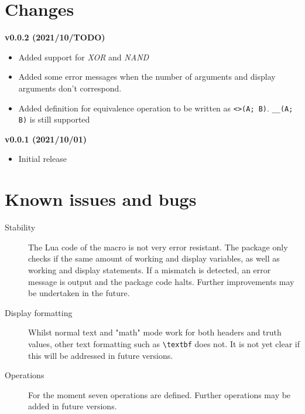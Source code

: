 \documentclass[a4paper]{article}
\begin{document}
\section{Changes}

\textbf{v0.0.2 (2021/10/TODO)}

\begin{itemize}
	\item Added support for \emph{XOR} and \emph{NAND}
	\item Added some error messages when the number of arguments and display arguments don't correspond.
	\item Added definition for equivalence operation to be written as \texttt{<>(A; B)}.  \texttt{\_\_(A; B)} is still supported
\end{itemize}
\textbf{v0.0.1 (2021/10/01)}

\begin{itemize}
	\item Initial release
\end{itemize}

\section{Known issues and bugs}

\begin{description}
	\item[Stability] The Lua code of the macro is not very error resistant. The package only checks if the same amount of working and display variables, as well as working and display statements. If a mismatch is detected, an error message is output and the package code halts. Further improvements may be undertaken in the future.
	\item[Display formatting] Whilst normal text and "math" mode work for both headers and truth values, other text formatting such as \texttt{\textbackslash textbf} does not. It is not yet clear if this will be addressed in future versions.
	\item[Operations] For the moment seven operations are defined. Further operations may be added in future versions.
\end{description}
\end{document}
